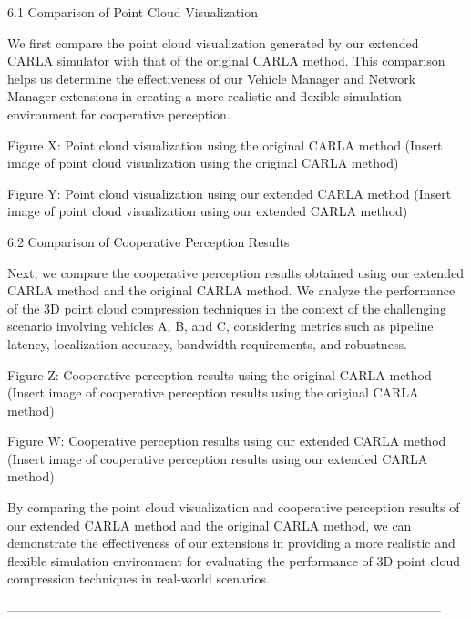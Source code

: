 \documentclass[conference]{IEEEtran}
\begin{document}
6.1 Comparison of Point Cloud Visualization

We first compare the point cloud visualization generated by our extended CARLA simulator with that of the original CARLA method. This comparison helps us determine the effectiveness of our Vehicle Manager and Network Manager extensions in creating a more realistic and flexible simulation environment for cooperative perception.

Figure X: Point cloud visualization using the original CARLA method
(Insert image of point cloud visualization using the original CARLA method)

Figure Y: Point cloud visualization using our extended CARLA method
(Insert image of point cloud visualization using our extended CARLA method)

6.2 Comparison of Cooperative Perception Results

Next, we compare the cooperative perception results obtained using our extended CARLA method and the original CARLA method. We analyze the performance of the 3D point cloud compression techniques in the context of the challenging scenario involving vehicles A, B, and C, considering metrics such as pipeline latency, localization accuracy, bandwidth requirements, and robustness.

Figure Z: Cooperative perception results using the original CARLA method
(Insert image of cooperative perception results using the original CARLA method)

Figure W: Cooperative perception results using our extended CARLA method
(Insert image of cooperative perception results using our extended CARLA method)

By comparing the point cloud visualization and cooperative perception results of our extended CARLA method and the original CARLA method, we can demonstrate the effectiveness of our extensions in providing a more realistic and flexible simulation environment for evaluating the performance of 3D point cloud compression techniques in real-world scenarios.








------------------------------------------------------------------------------------------------------

\end{document}
